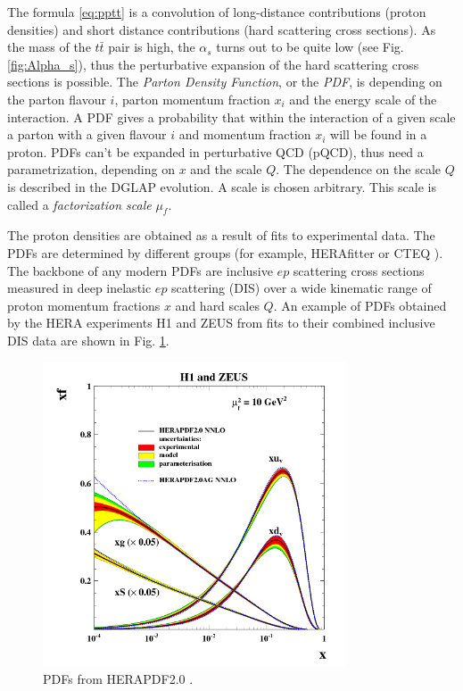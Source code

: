 The formula \ref{eq:pptt} is a convolution of long-distance contributions (proton densities) and short distance contributions (hard scattering cross sections). 
As the mass of the $t\bar{t}$ pair is high, the $\alpha_{s}$ turns out
to be quite low (see Fig. \ref{fig:Alpha_s}), thus the perturbative expansion of the hard scattering cross sections is possible.
The \textit{Parton Density Function}, or the \textit{PDF}, is depending on the parton flavour $i$, parton momentum
fraction $x_{i}$ and the energy scale of the interaction. A PDF gives a probability that within the interaction of a given scale a parton with a given flavour $i$
and momentum fraction $x_{i}$ will be found in a proton. PDFs can't be expanded in perturbative QCD (pQCD), thus need a parametrization, depending on $x$ and 
the scale $Q$. The dependence on the scale $Q$ is described in the DGLAP evolution\cite{Altarelli:1977zs, Dokshitzer:1977sg, Gribov:1972ri}. A scale is chosen arbitrary.
This scale is called a \textit{factorization scale} $\mu_{f}$.

The proton densities are obtained as a result of fits to experimental data. 
The PDFs are determined by different groups (for example, HERAfitter \cite{Alekhin:2014irh} or 
CTEQ \cite{Pumplin:2002vw}). The backbone of any modern PDFs are inclusive $ep$ scattering cross sections
measured in deep inelastic $ep$ scattering (DIS) over a wide kinematic range of proton momentum fractions $x$ and hard scales $Q$. 
An example of PDFs obtained by the HERA experiments H1 and ZEUS from fits to their combined inclusive DIS data are shown in Fig. \ref{fig:HERA_PDF}.

\begin{figure}[t]
  \centering
  \includegraphics[width=0.8\textwidth]{01_Theory_SM/plots/d15-039f23.png}
  \caption{PDFs from HERAPDF2.0 \cite{Abramowicz:2015mha}.}
  \label{fig:HERA_PDF}
\end{figure}

